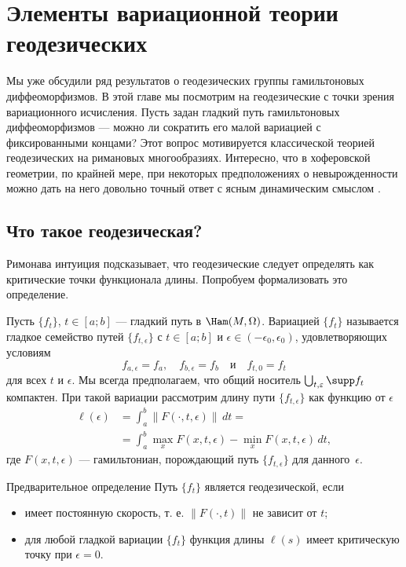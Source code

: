 \chapter[Геодезические]{Элементы вариационной теории геодезических}

Мы уже обсудили ряд результатов о геодезических группы гамильтоновых диффеоморфизмов.
В этой главе мы посмотрим на геодезические с точки зрения вариационного исчисления.
Пусть задан гладкий путь гамильтоновых диффеоморфизмов --- можно ли сократить его малой вариацией с фиксированными концами?
Этот вопрос мотивируется классической теорией геодезических на римановых многообразиях.
Интересно, что в хоферовской геометрии, по крайней мере, при некоторых предположениях о невырожденности можно дать на него довольно точный ответ с ясным динамическим смыслом \cite{U}.

\section{Что такое геодезическая?}

Римонава интуиция подсказывает, что геодезические следует определять как критические точки функционала длины.
Попробуем формализовать это определение.

Пусть $\{f_t\}$, $t\in[a; b]$ --- гладкий путь в $\Ham(M,\Omega)$.
Вариацией $\{f_t\}$ называется гладкое семейство путей $\{f_{t,\epsilon}\}$ с $t \in [a; b]$ и $\epsilon \in (-\epsilon_0, \epsilon_0)$, удовлетворяющих условиям
\[f_{a,\epsilon} = f_a,\quad f_{b,\epsilon} = f_b\quad\text{и}\quad f_{t,0} = f_t\]
для всех $t$ и $\epsilon$.
Мы всегда предполагаем, что общий носитель $\bigcup_{t,\epsilon}\supp f_t$ компактен.
При такой вариации рассмотрим длину пути $\{f_{t,\epsilon}\}$ как функцию от $\epsilon$ 
\begin{align*}
\ell(\epsilon)&=\int_a^b\|F(\cdot,t,\epsilon)\|\,dt=
\\
&=\int_a^b \max_x F(x,t,\epsilon)-\min_x F(x,t,\epsilon)\,dt,
\end{align*} 
где $F(x, t, \epsilon)$ --- гамильтониан, порождающий путь $\{f_{t,\epsilon}\}$ для данного~$\epsilon$.

\begin{ex}{Предварительное определение}\label{12.1.A}
Путь $\{f_t\}$ является геодезической, если
\begin{itemize}
\item имеет постоянную скорость, т. е. $\|F(\cdot, t)\|$ не зависит от $t$;
\item для любой гладкой вариации $\{f_t\}$ функция длины $\ell(s)$ имеет критическую точку при $\epsilon = 0$.
\end{itemize}
\end{ex}

